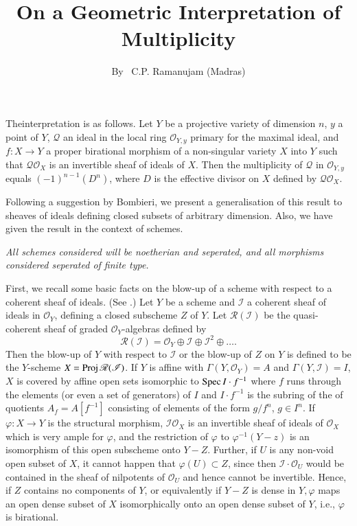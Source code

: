 \title{On a Geometric Interpretation of Multiplicity}\label{art11}

\author{By~ C.P. Ramanujam (Madras)}

\date{}
\maketitle

\setcounter{page}{151}
\setcounter{pageoriginal}{118}
The\pageoriginale interpretation is as follows. Let $Y$ be a projective variety of dimension $n$, $y$ a point of $Y$, $\mathscr{Q}$ an ideal in the local ring $\mathscr{O}_{Y,y}$ primary for the maximal ideal, and $f: X \to Y$ a proper birational morphism of a non-singular variety $X$ into $Y$ such that $\mathscr{Q}\mathscr{O}_X$ is an invertible sheaf of ideals of $X$. Then the multiplicity of $\mathscr{Q}$ in $\mathscr{O}_{Y,y}$ equals $(-1)^{n-1} (D^n)$, where $D$ is the effective divisor on $X$ defined by $\mathscr{Q} \mathscr{O}_X$.

Following a suggestion by Bombieri, we present a generalisation of this result to sheaves of ideals defining closed subsets of arbitrary dimension. Also, we have given the result in the context of schemes.

{\em All schemes considered will be noetherian and seperated, and all morphisms considered seperated of finite type.}

First, we recall some basic facts on the blow-up of a scheme with respect to a coherent sheaf of ideals. (See \cite{art11-key1}.) Let $Y$ be a scheme and $\mathscr{I}$ a coherent sheaf of ideals in $\mathscr{O}_Y$, defining a closed subscheme $Z$ of $Y$. Let $\mathscr{R} (\mathscr{I})$ be the quasi-coherent sheaf of graded $\mathscr{O}_Y$-algebras defined by
$$
\mathscr{R} (\mathscr{I}) = \mathscr{O}_Y \oplus \mathscr{I} \oplus \mathscr{I}^2 \oplus \ldots.
$$
Then the blow-up of $Y$ with respect to $\mathscr{I}$ or the blow-up of $Z$ on $Y$ is defined to be the $Y$-scheme $X = \operatorname{Proj} \mathscr{R}(\mathscr{I})$. If $Y$ is affine with $\Gamma (Y, \mathscr{O}_Y) = A$ and $\Gamma (Y, \mathscr{I}) = I$, $X$ is covered by affine open sets isomorphic to $\operatorname{Spec} I \cdot f^{-1}$ where $f$ runs through the elements (or even a set of generators) of $I$ and $I \cdot f^{-1}$ is the subring of the of quotients $A_f = A[f^{-1}]$ consisting of elements of the form $g/f^n$, $g \in I^n$. If $\varphi: X \to Y$ is the structural morphism, $\mathscr{I} \mathscr{O}_X$ is an invertible sheaf of ideals of $\mathscr{O}_X$ which is very ample for $\varphi$, and the restriction of $\varphi$ to $\varphi^{-1}(Y-z)$ is an isomorphism of this open subscheme onto $Y-Z$. Further, if $U$ is any non-void open subset of $X$, it cannot happen that $\varphi (U) \subset Z$, since then $\mathscr{I} \cdot \mathscr{O}_U$ would be contained in the sheaf of nilpotents of $\mathscr{O}_U$ and hence cannot be invertible. Hence, if $Z$ contains no components of $Y$, or equivalently if $Y - Z$ is dense in $Y, \varphi$ maps an open dense subset of $X$ isomorphically onto an open dense subset of $Y$, i.e., $\varphi$ is birational.

